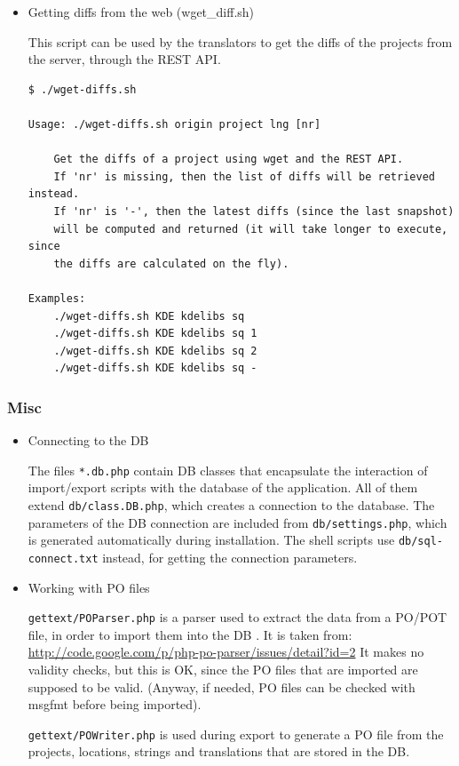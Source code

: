 \documentclass[11pt]{article}
\begin{document}
\begin{itemize}
\item Getting diffs from the web (wget\_{}diff.sh)\\
\label{sec-8.4.4.6}


     This script can be used by the translators to get the diffs of the
     projects from the server, through the REST API.


\begin{verbatim}
$ ./wget-diffs.sh

Usage: ./wget-diffs.sh origin project lng [nr]

    Get the diffs of a project using wget and the REST API.
    If 'nr' is missing, then the list of diffs will be retrieved instead.
    If 'nr' is '-', then the latest diffs (since the last snapshot)
    will be computed and returned (it will take longer to execute, since
    the diffs are calculated on the fly). 

Examples:
    ./wget-diffs.sh KDE kdelibs sq
    ./wget-diffs.sh KDE kdelibs sq 1
    ./wget-diffs.sh KDE kdelibs sq 2
    ./wget-diffs.sh KDE kdelibs sq -
\end{verbatim}




\end{itemize} %
\subsubsection{Misc}
\label{sec-8.4.5}


\begin{itemize}

\item Connecting to the DB\\
\label{sec-8.4.5.1}


     The files \texttt{*.db.php} contain DB classes that encapsulate the
     interaction of import/export scripts with the database of the
     application. All of them extend \texttt{db/class.DB.php}, which creates a
     connection to the database. The parameters of the DB connection are
     included from \texttt{db/settings.php}, which is generated automatically
     during installation.  The shell scripts use \texttt{db/sql-connect.txt}
     instead, for getting the connection parameters.


\item Working with PO files\\
\label{sec-8.4.5.2}


     \texttt{gettext/POParser.php} is a parser used to extract the data from a
     PO/POT file, in order to import them into the DB . It is taken from:
     \href{http://code.google.com/p/php-po-parser/issues/detail?id=2}{http://code.google.com/p/php-po-parser/issues/detail?id=2} It makes
     no validity checks, but this is OK, since the PO files that are
     imported are supposed to be valid. (Anyway, if needed, PO files can
     be checked with msgfmt before being imported).

     \texttt{gettext/POWriter.php} is used during export to generate a PO file
     from the projects, locations, strings and translations that are
     stored in the DB.



\end{itemize} %
\end{document}
